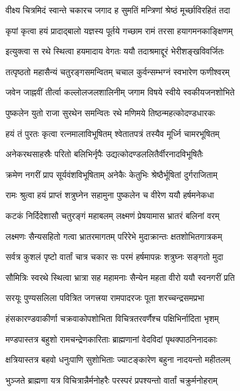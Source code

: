 \twolineshloka
{वीक्ष्य चित्रमिदं स्वान्ते चकारच जगाद ह}
{सुमतिं मन्त्रिणां श्रेष्ठं मूर्च्छाविरहितं तदा}%

\twolineshloka
{कृपां कृत्वा हयं प्रादाद्बालो यज्ञस्य पूर्तये}
{गच्छाम रामं तरसा हयागमनकाङ्क्षिणम्}%

\twolineshloka
{इत्युक्त्वा स रथे स्थित्वा हयमादाय वेगतः}
{ययौ तदाश्रमाद्दूरं भेरीशङ्खविवर्जितः}%

\twolineshloka
{तत्पृष्ठतो महासैन्यं चतुरङ्गसमन्वितम्}
{चचाल कुर्वन्सम्भग्नं स्वभारेण फणीश्वरम्}%

\twolineshloka
{जवेन जाह्नवीं तीर्त्वा कल्लोलजलशालिनीम्}
{जगाम विषये स्वीये स्वकीयजनशोभिते}%

\twolineshloka
{पुष्कलेन युतो राजा सुरथेन समन्वितः}
{रथे मणिमये तिष्ठन्महत्कोदण्डधारकः}%

\twolineshloka
{हयं तं पुरतः कृत्वा रत्नमालाविभूषितम्}
{श्वेतातपत्रं तस्यैव मूर्ध्नि चामरभूषितम्}%

\twolineshloka
{अनेकरथसाहस्रैः परितो बलिभिर्नृपैः}
{उद्यत्कोदण्डललितैर्वीरनादविभूषितैः}%

\twolineshloka
{क्रमेण नगरीं प्राप सूर्यवंशविभूषिताम्}
{अनेकैः केतुभिः श्रेष्ठैर्भूषितां दुर्गराजिताम्}%

\twolineshloka
{रामः श्रुत्वा हयं प्राप्तं शत्रुघ्नेन सहामुना}
{पुष्कलेन च वीरेण ययौ हर्षमनेकधा}%

\twolineshloka
{कटकं निर्दिदेशासौ चतुरङ्गं महाबलम्}
{लक्ष्मणं प्रेषयामास भ्रातरं बलिनां वरम्}%

\twolineshloka
{लक्ष्मणः सैन्यसहितो गत्वा भ्रातरमागतम्}
{परिरेभे मुदाक्रान्तः क्षतशोभितगात्रकम्}%

\twolineshloka
{सर्वत्र कुशलं पृष्टो वार्तां चात्र चकार सः}
{परमं हर्षमापन्नः शत्रुघ्नः सङ्गतो मुदा}%

\twolineshloka
{सौमित्रिः स्वरथे स्थित्वा भ्रात्रा सह महामनाः}
{सैन्येन महता वीरो ययौ स्वनगरीं प्रति}%

\twolineshloka
{सरयूः पुण्यसलिला पवित्रित जगत्त्रया}
{रामपादरजः पूता शरच्चन्द्रसमप्रभा}%

\twolineshloka
{हंसकारण्डवाकीर्णा चक्रवाकोपशोभिता}
{विचित्रतरवर्णैश्च पक्षिभिर्नादिता भृशम्}%

\twolineshloka
{मण्डपास्तत्र बहुशो रामचन्द्रेणकारिताः}
{ब्राह्मणानां वेदविदां पृथक्पाठनिनादकाः}%

\twolineshloka
{क्षत्रियास्तत्र बहवो धनुःपाणि सुशोभिताः}
{ज्याटङ्कारेण बहुना नादयन्तो महीतलम्}%

\twolineshloka
{भुञ्जते ब्राह्मणा यत्र विचित्रान्नैर्मनोहरैः}
{परस्परं प्रपश्यन्तो वार्तां चक्रुर्मनोहराम्}%

